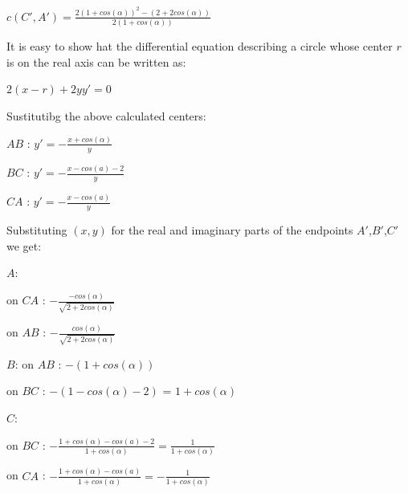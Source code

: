 \documentclass[a4paper,10pt]{article}
\begin{document}
  $c\left(C',A'\right) = \frac{2\left(1 + cos\left( \alpha \right) \right)^2 - \left(2 + 2cos\left(\alpha\right)\right)} 
                                         {2\left(1+cos\left(\alpha \right) \right)}    $


It is easy to show hat the differential equation describing a circle whose center
$r$ is on the real axis can be written as:

$2\left(x-r\right)+2yy'=0$

Sustitutibg the above calculated centers:
  
\noindent $AB$ :  $y' = -\frac{x + cos\left(\alpha \right)}{ y} $

\noindent $BC$ :  $y' = -\frac{x - cos\left(a\right) - 2}{y}$

\noindent $CA$ :  $y' = -\frac{x - cos\left(a\right)}{y}$


Substituting $(x,y)$ for the real and imaginary parts of the endpoints $A'$,$B'$,$C'$ we get:

\noindent $A$: 

on $CA$ : $-\frac{-cos\left(\alpha \right)}{\sqrt{2 + 2 cos\left(\alpha\right)}}$

on $AB$ : $-\frac{cos\left(\alpha \right)}{\sqrt{2 + 2 cos\left(\alpha\right)}}$

\noindent $B$: 
on $AB$ : $-\left(1 + cos\left(\alpha \right)\right)$

on $BC$ : $-\left(1 - cos\left(\alpha \right) - 2\right)$ =  $1 + cos\left(\alpha \right)$

\noindent $C$: 

on $BC$ : $-\frac{1 + cos\left(\alpha\right) - cos\left(a\right) - 2}{1 + cos\left(\alpha\right)} = \frac{1}{1 + cos\left(\alpha\right)}$

on $CA$ : $-\frac{1 + cos\left(\alpha\right) - cos\left(a\right)    }{1 + cos\left(\alpha\right)} = -\frac{1}{1 + cos\left(\alpha\right)}$
\end{document}
